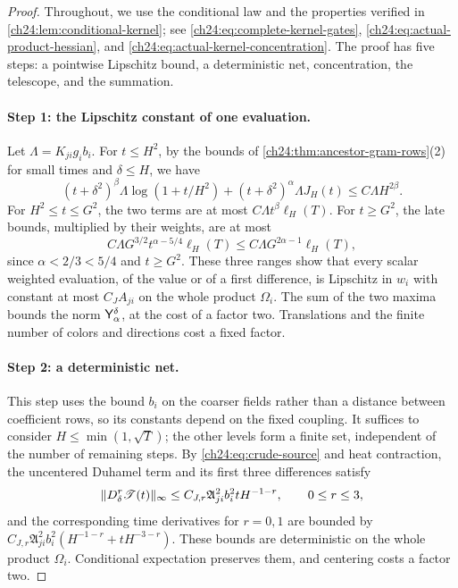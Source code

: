 \begin{proof}
Throughout, we use the conditional law and the properties verified in \cref{ch24:lem:conditional-kernel}; see \eqref{ch24:eq:complete-kernel-gates}, \eqref{ch24:eq:actual-product-hessian}, and \eqref{ch24:eq:actual-kernel-concentration}. The proof has five steps: a pointwise Lipschitz bound, a deterministic net, concentration, the telescope, and the summation.

\paragraph{Step 1: the Lipschitz constant of one evaluation.}
Let $\Lambda=K_{ji}g_ib_i$. For $t\le H^2$, by the bounds of \cref{ch24:thm:ancestor-gram-rows}(2) for small times and $\delta\le H$, we have
\[
 (t+\delta^2)^\beta\Lambda\log(1+t/H^2)+(t+\delta^2)^\alpha\Lambda J_H(t)\le C\Lambda H^{2\beta}.
\]
For $H^2\le t\le G^2$, the two terms are at most $C\Lambda t^\beta\ell_H(T)$. For $t\ge G^2$, the late bounds, multiplied by their weights, are at most
\[
 C\Lambda G^{3/2}t^{\alpha-5/4}\ell_H(T)\le C\Lambda G^{2\alpha-1}\ell_H(T),
\]
since $\alpha<2/3<5/4$ and $t\ge G^2$. These three ranges show that every scalar weighted evaluation, of the value or of a first difference, is Lipschitz in $w_i$ with constant at most $C_JA_{ji}$ on the whole product $\Omega_i$. The sum of the two maxima bounds the norm $\mathsf Y_{\alpha}^{\delta}$, at the cost of a factor two. Translations and the finite number of colors and directions cost a fixed factor.

\paragraph{Step 2: a deterministic net.}
This step uses the bound $b_i$ on the coarser fields rather than a distance between coefficient rows, so its constants depend on the fixed coupling. It suffices to consider $H\le\min(1,\sqrt T)$; the other levels form a finite set, independent of the number of remaining steps. By \eqref{ch24:eq:crude-source} and heat contraction, the uncentered Duhamel term and its first three differences satisfy
\begin{equation}\label{ch24:eq:sample-cover-bounds}
 \lVert D_\delta^r\mathscr T(t)\rVert_\infty\le C_{J,r}\mathfrak A_{ji}^2b_i^2tH^{-1-r},\qquad 0\le r\le3,
\end{equation}
and the corresponding time derivatives for $r=0,1$ are bounded by $C_{J,r}\mathfrak A_{ji}^2b_i^2(H^{-1-r}+tH^{-3-r})$. These bounds are deterministic on the whole product $\Omega_i$. Conditional expectation preserves them, and centering costs a factor two.


\end{proof}
